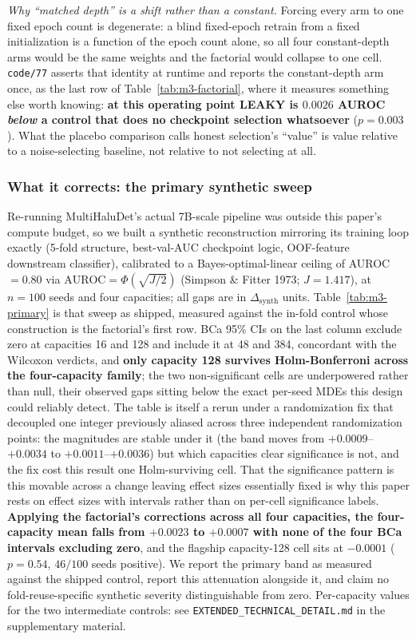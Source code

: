 \documentclass[10pt]{article} %
\begin{document}
\emph{Why ``matched depth'' is a shift rather than a constant.} Forcing every
arm to one fixed epoch count is degenerate: a blind fixed-epoch retrain from a
fixed initialization is a function of the epoch count alone, so all four
constant-depth arms would be the same weights and the factorial would collapse
to one cell. \texttt{code/77} asserts that identity at runtime and reports the
constant-depth arm once, as the last row of Table~\ref{tab:m3-factorial}, where
it measures something else worth knowing: \textbf{at this operating point LEAKY
is $0.0026$ AUROC \emph{below} a control that does no checkpoint selection
whatsoever} ($p=0.003$). What the placebo comparison calls honest selection's
``value'' is value relative to a noise-selecting baseline, not relative to not
selecting at all.

\subsubsection{What it corrects: the primary synthetic sweep}

Re-running MultiHaluDet's actual 7B-scale pipeline was outside this paper's
compute budget, so we built a synthetic reconstruction mirroring its training
loop exactly (5-fold structure, best-val-AUC checkpoint logic, OOF-feature
downstream classifier), calibrated to a Bayes-optimal-linear ceiling of
AUROC$=0.80$ via $\text{AUROC}=\Phi(\sqrt{J/2})$ (Simpson \& Fitter 1973;
$J=1.417$), at $n=100$ seeds and four capacities; all gaps are in
$\Delta_{\text{synth}}$ units. Table~\ref{tab:m3-primary} is that sweep as
shipped, measured against the in-fold control whose construction is the
factorial's first row. BCa 95\% CIs on the last column exclude zero at
capacities 16 and 128 and include it at 48 and 384, concordant with the
Wilcoxon verdicts, and \textbf{only capacity 128 survives Holm-Bonferroni
across the four-capacity family}; the two non-significant cells are underpowered
rather than null, their observed gaps sitting below the exact per-seed MDEs
this design could reliably detect. The table is itself a rerun under a
randomization fix that decoupled one integer previously aliased across three
independent randomization points: the magnitudes are stable under it (the band
moves from $+0.0009$--$+0.0034$ to $+0.0011$--$+0.0036$) but which capacities
clear significance is not, and the fix cost this result one Holm-surviving
cell. That the significance pattern is this movable across a change leaving
effect sizes essentially fixed is why this paper rests on effect sizes with
intervals rather than on per-cell significance labels. \textbf{Applying the
factorial's corrections across all four capacities, the four-capacity mean
falls from $+0.0023$ to $+0.0007$ with none of the four BCa intervals excluding
zero}, and the flagship capacity-128 cell sits at $-0.0001$ ($p=0.54$, $46/100$
seeds positive). We report the primary band as measured against the shipped
control, report this attenuation alongside it, and claim no fold-reuse-specific
synthetic severity distinguishable from zero. Per-capacity values for the two
intermediate controls: see \texttt{EXTENDED\_TECHNICAL\_DETAIL.md} in the
supplementary material.
\end{document}
